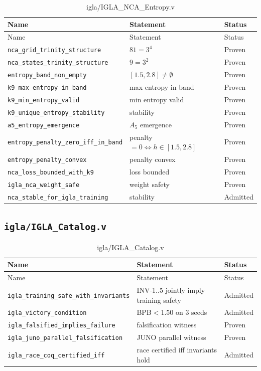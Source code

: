 \begin{longtable}{lll}
\toprule
Name & Statement & Status \\
\midrule
\endfirsthead
\toprule
Name & Statement & Status \\
\midrule
\endhead
\bottomrule
\endfoot
\bottomrule
\caption{igla/IGLA\_NCA\_Entropy.v}
\endlastfoot
\texttt{nca\_grid\_trinity\_structure} & $81=3^{4}$ & Proven \\
\texttt{nca\_states\_trinity\_structure} & $9=3^{2}$ & Proven \\
\texttt{entropy\_band\_non\_empty} & $[1.5,2.8]\neq\emptyset$ & Proven \\
\texttt{k9\_max\_entropy\_in\_band} & max entropy in band & Proven \\
\texttt{k9\_min\_entropy\_valid} & min entropy valid & Proven \\
\texttt{k9\_unique\_entropy\_stability} & stability & Proven \\
\texttt{a5\_entropy\_emergence} & $A_5$ emergence & Proven \\
\texttt{entropy\_penalty\_zero\_iff\_in\_band} &
  penalty$=0\Leftrightarrow h\in[1.5,2.8]$ & Proven \\
\texttt{entropy\_penalty\_convex} & penalty convex & Proven \\
\texttt{nca\_loss\_bounded\_with\_k9} & loss bounded & Proven \\
\texttt{igla\_nca\_weight\_safe} & weight safety & Proven \\
\texttt{nca\_stable\_for\_igla\_training} & stability & Admitted \\
\end{longtable}

\subsection{\texttt{igla/IGLA\_Catalog.v}}
\label{sec:A-coq-igla-cat}

\begin{longtable}{lll}
\toprule
Name & Statement & Status \\
\midrule
\endfirsthead
\toprule
Name & Statement & Status \\
\midrule
\endhead
\bottomrule
\endfoot
\bottomrule
\caption{igla/IGLA\_Catalog.v}
\endlastfoot
\texttt{igla\_training\_safe\_with\_invariants} &
  INV-1..5 jointly imply training safety & Admitted \\
\texttt{igla\_victory\_condition} &
  BPB$<1.50$ on 3 seeds & Admitted \\
\texttt{igla\_falsified\_implies\_failure} &
  falsification witness & Proven \\
\texttt{igla\_juno\_parallel\_falsification} &
  JUNO parallel witness & Proven \\
\texttt{igla\_race\_coq\_certified\_iff} &
  race certified iff invariants hold & Admitted \\
\end{longtable}

